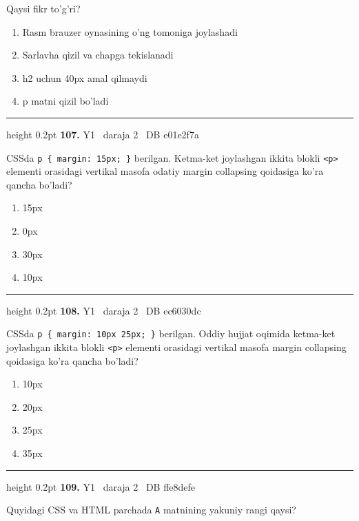 \documentclass[10pt,a4paper,oneside]{article}
\begin{document}
\par
Qaysi fikr to'g'ri?
\begin{enumerate}[label=\Alph*),leftmargin=9mm]
\item Rasm brauzer oynasining o'ng tomoniga joylashadi
\item Sarlavha qizil va chapga tekislanadi
\item h2 uchun 40px amal qilmaydi
\item p matni qizil bo'ladi
\end{enumerate}
\vspace{2mm}\hrule height 0.2pt \vspace{4mm}
\hypertarget{q107}{\textbf{\color{ink}107.}}  {\color{muted}\scriptsize Y1 \textbullet\ daraja 2 \textbullet\ DB e01e2f7a}
\par
CSSda \texttt{p \{ margin: 15px; \}} berilgan. Ketma-ket joylashgan ikkita blokli \texttt{\textless{}p\textgreater{}} elementi orasidagi vertikal masofa odatiy margin collapsing qoidasiga ko'ra qancha bo'ladi?
\begin{enumerate}[label=\Alph*),leftmargin=9mm]
\item 15px
\item 0px
\item 30px
\item 10px
\end{enumerate}
\vspace{2mm}\hrule height 0.2pt \vspace{4mm}
\hypertarget{q108}{\textbf{\color{ink}108.}}  {\color{muted}\scriptsize Y1 \textbullet\ daraja 2 \textbullet\ DB ec6030dc}
\par
CSSda \texttt{p \{ margin: 10px 25px; \}} berilgan. Oddiy hujjat oqimida ketma-ket joylashgan ikkita blokli \texttt{\textless{}p\textgreater{}} elementi orasidagi vertikal masofa margin collapsing qoidasiga ko'ra qancha bo'ladi?
\begin{enumerate}[label=\Alph*),leftmargin=9mm]
\item 10px
\item 20px
\item 25px
\item 35px
\end{enumerate}
\vspace{2mm}\hrule height 0.2pt \vspace{4mm}
\hypertarget{q109}{\textbf{\color{ink}109.}}  {\color{muted}\scriptsize Y1 \textbullet\ daraja 2 \textbullet\ DB ffe8defe}
\par
Quyidagi CSS va HTML parchada \texttt{A} matnining yakuniy rangi qaysi?
\end{document}
